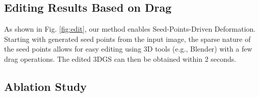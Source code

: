 

\subsection{Editing Results Based on Drag}
As shown in Fig. \ref{fig:edit}, our method enables Seed-Points-Driven Deformation. Starting with generated seed points from the input image, the sparse nature of the seed points allows for easy editing using 3D tools (e.g., Blender\cite{blender}) with a few drag operations. The edited 3DGS can then be obtained within 2 seconds.
\subsection{Ablation Study}
